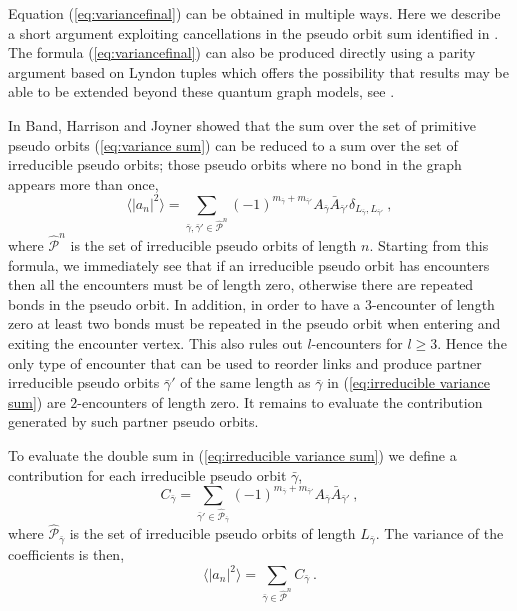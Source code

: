 \documentclass[doublecol]{epl2}
\newcommand{\bg}{\bar{\gamma}}
\begin{document}
Equation (\ref{eq:variancefinal}) can be obtained in multiple ways.  Here we describe a short argument exploiting cancellations in the pseudo orbit sum identified in \cite{BHJ12}.   The formula (\ref{eq:variancefinal}) can also be produced directly using a parity argument based on Lyndon tuples which offers the possibility that results may be able to be extended beyond these quantum graph models, see \cite{HH20} .  

In \cite{BHJ12} Band, { Harrison} and Joyner showed that the sum over the set of primitive pseudo orbits (\ref{eq:variance sum}) can be reduced to a sum over the set of irreducible pseudo orbits; those pseudo orbits where no bond in the graph appears more than once, 
\begin{equation}
\langle |a_n|^2 \rangle
= \sum_{\bg, \bg' \in \widehat{\mathcal{P}}^n} 
(-1)^{m_{\bg}+m_{\bg'}} 
A_{\bg} \bar{A}_{\bg'}   
\delta_{L_{\bg}, L_{\bg'}} \ ,
\label{eq:irreducible variance sum} 
\end{equation}
where $\widehat{\mathcal{P}}^n$ is the set of irreducible pseudo orbits of length $n$.
Starting from this formula, we immediately see that if an irreducible pseudo orbit has encounters then all the encounters must be of length zero, otherwise there are repeated bonds in the pseudo orbit.  In addition, in order to have a $3$-encounter of length zero at least two bonds must be repeated in the pseudo orbit when entering and exiting the encounter vertex.  This also rules out $l$-encounters for $l\geq 3$.  Hence the only type of encounter that can be used to reorder links and produce partner irreducible pseudo orbits $\bg'$ of the same length as $\bg$  in (\ref{eq:irreducible variance sum}) are $2$-encounters of length zero.  It remains to evaluate the contribution generated by such partner pseudo orbits.

To evaluate the double sum in (\ref{eq:irreducible variance sum}) we define a contribution for each irreducible pseudo orbit $\bg$,
\begin{equation}
C_{\bg} = \sum_{\bg' \in \widehat{\mathcal{P}}_{\bg} }
(-1)^{m_{\bg}+m_{\bg'}}
A_{\bg} \bar{A}_{\bg'} \ ,
\label{eq:C}
\end{equation}
where $\widehat{\mathcal{P}}_{\bg}$ is the set of irreducible pseudo orbits of length $L_{\bg}$. 
The variance of the coefficients is then,
\begin{equation}
\label{eq:variance C sum}
\langle |a_n|^2 \rangle =
\sum_{\bg \in \widehat{\mathcal{P}}^n} C_{\bg} \ .
\end{equation}
\end{document}
